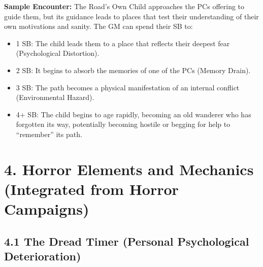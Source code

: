 \documentclass[11pt]{article}
\begin{document}
\textbf{Sample Encounter:} The Road's Own Child approaches the PCs offering to guide them, but its guidance leads to places that test their understanding of their own motivations and sanity. The GM can spend their SB to:
\begin{itemize}
\item 1 SB: The child leads them to a place that reflects their deepest fear (Psychological Distortion).
\item 2 SB: It begins to absorb the memories of one of the PCs (Memory Drain).
\item 3 SB: The path becomes a physical manifestation of an internal conflict (Environmental Hazard).
\item 4+ SB: The child begins to age rapidly, becoming an old wanderer who has forgotten its way, potentially becoming hostile or begging for help to ``remember'' its path.
\end{itemize}

\clearpage

\section*{4. Horror Elements and Mechanics (Integrated from Horror Campaigns)}

\subsection*{4.1 The Dread Timer (Personal Psychological Deterioration)}
\end{document}
